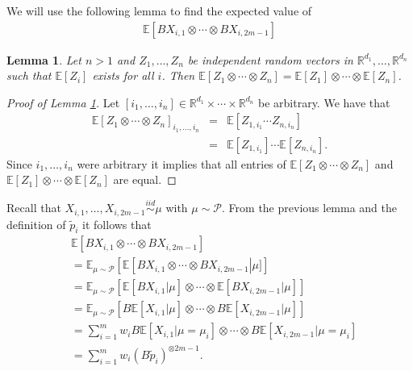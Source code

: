 \documentclass[aos,preprint]{imsart}
\def\rn{\mathbb{R}}
\def\l{\left}
\def\r{\right}
\def\sP{\mathscr{P}}
\def\simiid{\overset{iid}{\sim}}
\theoremstyle{plain}
\newtheorem{lem}{Lemma}[section]
\theoremstyle{defintion}
\begin{document}
We will use the following lemma to find the expected value of 
\begin{align*}
	\mathbb{E}\left[ BX_{i,1}\otimes \cdots \otimes BX_{i,2m-1} \right]
\end{align*}
\begin{lem}\label{lem:tensind}
	Let $n>1$ and $Z_1, \ldots, Z_n$ be independent random vectors in $\rn^{d_1},\ldots, \rn^{d_n}$ such that $\mathbb{E} \left[ Z_i \right] $ exists for all $i$. Then $\mathbb{E}\left[ Z_1\otimes \cdots \otimes Z_n \right] = \mathbb{E}\left[ Z_1 \right] \otimes \cdots \otimes \mathbb{E}\left[ Z_n \right]$.
\end{lem}
\begin{proof}[Proof of Lemma \ref{lem:tensind}]
	Let $\l[i_1,\ldots, i_n\r] \in \rn^{d_1}\times \cdots \times \rn^{d_n}$ be arbitrary. We have that 
	\begin{eqnarray*}
		\mathbb{E}\left[ Z_1\otimes\cdots \otimes Z_n \right]_{i_1,\ldots,i_n}
		&=& \mathbb{E}\left[ Z_{1,i_1} \cdots Z_{n,i_n} \right]\\
		&=& \mathbb{E}\left[ Z_{1,i_1}\r] \cdots\mathbb{E} \l[ Z_{n,i_n} \right].
	\end{eqnarray*}
	Since $i_1,\ldots, i_n$ were arbitrary it implies that all entries of $\mathbb{E}\left[ Z_1\otimes \cdots \otimes Z_n \right]$ and $\mathbb{E}\left[ Z_1 \right]\otimes \cdots \otimes \mathbb{E}\left[ Z_n \right]$ are equal.
\end{proof}
Recall that $X_{i,1},\ldots,X_{i,2m-1} \simiid \mu$ with $\mu \sim \sP$. From the previous lemma and the definition of $\tilde{p}_i$ it follows that 
\begin{align*}
	&\mathbb{E}\left[ BX_{i,1} \otimes \cdots \otimes BX_{i,2m-1} \right]\\
	&=\mathbb{E}_{\mu\sim \sP}\left[ \mathbb{E}\left[ BX_{i,1} \otimes \cdots \otimes BX_{i,2m-1} \right| \mu] \right] \\
	&=\mathbb{E}_{\mu\sim \sP}\left[ \mathbb{E}\left[ BX_{i,1} |\mu\r] \otimes \cdots \otimes \mathbb{E}\l[BX_{i,2m-1}| \mu \right] \right] \\
	&=\mathbb{E}_{\mu\sim \sP}\left[ B\mathbb{E}\left[ X_{i,1}| \mu \r] \otimes \cdots \otimes B\mathbb{E}\l[X_{i,2m-1} | \mu\right] \right] \\
	&=\sum_{i=1}^m w_i B\mathbb{E}\left[ X_{i,1} |\mu = \mu_i\r] \otimes \cdots \otimes B\mathbb{E}\l[X_{i,2m-1}|\mu = \mu_i \right]  \\
	&=\sum_{i=1}^m w_i \left( B\tilde{p}_i \right)^{\otimes 2m-1} .
\end{align*}
\end{document}
